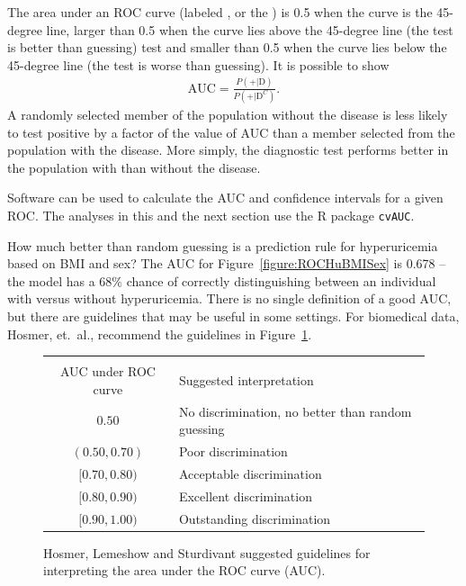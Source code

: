 The area under an ROC curve (labeled ,   or the ) is 0.5 when the curve is the 45-degree line, larger than 0.5 when the curve lies above the 45-degree line (the test is better than guessing) test and smaller than 0.5 when the curve lies below the 45-degree line (the test is worse than guessing).  It is possible to show 
\begin{align*}
\text{AUC} = \frac{P(+ | \text{D})}{P(+| \text{D}^C)}.
\end{align*}
A randomly selected member of the population without the disease is less likely to test positive by a factor of the value of AUC than a member selected from the population with the disease. More simply, the diagnostic test performs better in the population with than without the disease.

Software can be used to calculate the AUC and confidence intervals for a given ROC.  The analyses in this and the next section use the \textsf{R} package \texttt{cvAUC}.

How much better than random guessing is a prediction rule for hyperuricemia based on BMI and sex? The AUC for Figure~\ref{figure:ROCHuBMISex} is 0.678 -- the model has a $68\%$ chance of correctly distinguishing between an individual with versus  without hyperuricemia.  There is no single definition of a good AUC, but there are guidelines that may be useful in some settings.  For biomedical data, Hosmer, et.\ al., recommend the guidelines in Figure~\ref{figure:AUCGuidelines}.

\begin{figure}[ht]
\centering
  \begin{tabular}{cl}
  \hline \\
AUC under ROC curve & Suggested interpretation  \\
  \hline
    $0.50$ & No discrimination, no better than random guessing   \\
    $(0.50, 0.70)$ & Poor discrimination \\
    $[0.70, 0.80)$ & Acceptable discrimination   \\
    $[0.80, 0.90)$ &  Excellent discrimination  \\
    $[0.90, 1.00)$ & Outstanding discrimination   \\
   \hline
\end{tabular}
  \caption{Hosmer, Lemeshow and Sturdivant suggested guidelines for interpreting the area under the ROC curve (AUC).}
\label{figure:AUCGuidelines}
\end{figure}


